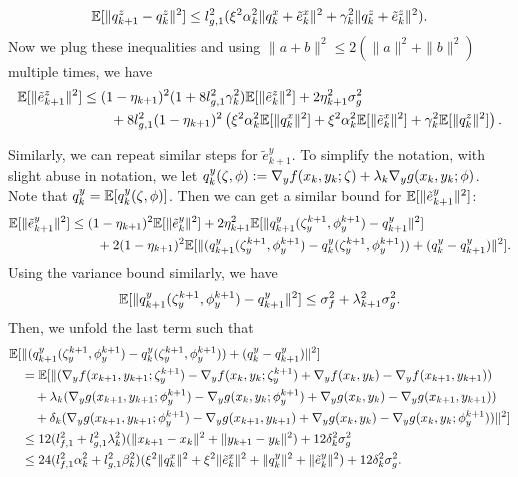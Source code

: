 \begin{align*}
    \mathbb{E}[\|q_{k+1}^z - q_k^z \|^2] \le l_{g,1}^2 (\xi^2 \alpha_k^2 \|q_k^x + \tilde{e}_k^x\|^2 + \gamma_k^2 \|q_k^z + \tilde{e}_k^z\|^2). 
\end{align*}
Now we plug these inequalities and using $\|a+b\|^2 \le 2(\|a\|^2 + \|b\|^2)$ multiple times, we have
\begin{align*}
    \mathbb{E}[\|\tilde{e}_{k+1}^z\|^2] &\le (1 - \eta_{k+1})^2 (1 + 8 l_{g,1}^2 \gamma_k^2) \mathbb{E}[\|\tilde{e}_k^z\|^2] + 2 \eta_{k+1}^2 \sigma_g^2 \\
    &\qquad + 8l_{g,1}^2 (1-\eta_{k+1})^2 \left( \xi^2\alpha_k^2 \mathbb{E}[\|q_k^x\|^2] + \xi^2\alpha_k^2 \mathbb{E}[\|\tilde{e}_k^x\|^2] + \gamma_k^2 \mathbb{E}[\|q_k^z\|^2] \right).
\end{align*}


Similarly, we can repeat similar steps for $\tilde{e}_{k+1}^y$. To simplify the notation, with slight abuse in notation, we let $q_k^y(\zeta, \phi) := \nabla_y f(x_{k}, y_{k};\zeta) + \lambda_{k} \nabla_y g (x_k, y_k; \phi)$. Note that $q_k^y = \mathbb{E}[q_k^y(\zeta, \phi)]$. Then we can get a similar bound for $\mathbb{E}[\| \tilde{e}_{k+1}^y \|^2]$:
\begin{align*}
    \mathbb{E}[\| \tilde{e}_{k+1}^y\|^2 ] &\le (1-\eta_{k+1})^2 \mathbb{E}[\| \tilde{e}_{k}^y\|^2 ] + 2 \eta_{k+1}^2 \mathbb{E}[\| q_{k+1}^y(\zeta_{y}^{k+1}, \phi_{y}^{k+1}) - q_{k+1}^y \|^2] \\
    &\qquad + 2(1-\eta_{k+1})^2 \mathbb{E}[\| (q_{k+1}^y (\zeta_{y}^{k+1}, \phi_{y}^{k+1}) - q_k^y (\zeta_{y}^{k+1}, \phi_{y}^{k+1})) + (q_k^y - q_{k+1}^y)\|^2 ].
\end{align*}
Using the variance bound similarly, we have
\begin{align*}
    \mathbb{E}[\| q_{k+1}^y(\zeta_{y}^{k+1}, \phi_{y}^{k+1}) - q_{k+1}^y \|^2] \le \sigma_f^2 + \lambda_{k+1}^2 \sigma_g^2.
\end{align*}
Then, we unfold the last term such that
\begin{align*}
    \mathbb{E}[&\| (q_{k+1}^y (\zeta_{y}^{k+1}, \phi_{y}^{k+1}) - q_k^y (\zeta_{y}^{k+1}, \phi_{y}^{k+1})) + (q_k^y - q_{k+1}^y)\|^2 ] \\
    &= \mathbb{E}[\| (\nabla_y f(x_{k+1}, y_{k+1}; \zeta_y^{k+1}) - \nabla_y f(x_{k}, y_{k}; \zeta_y^{k+1}) + \nabla_y f(x_{k}, y_k) - \nabla_y f(x_{k+1}, y_{k+1})) \\
    &\quad + \lambda_k (\nabla_y g(x_{k+1}, y_{k+1}; \phi_y^{k+1}) - \nabla_y g(x_k, y_k; \phi_y^{k+1}) + \nabla_y g(x_k, y_k) - \nabla_y g(x_{k+1}, y_{k+1})) \\
    &\quad + \delta_k (\nabla_y g(x_{k+1},y_{k+1}; \phi_{y}^{k+1}) - \nabla_y g(x_{k+1}, y_{k+1}) + \nabla_y g(x_k,y_k) - \nabla_y g(x_k, y_k; \phi_{y}^{k+1}) ) \|^2] \\
    &\le 12 (l_{f,1}^2  + l_{g,1}^2 \lambda_k^2) (\|x_{k+1} - x_k\|^2 + \|y_{k+1} - y_k\|^2) + 12 \delta_k^2 \sigma_g^2 \\
    &\le 24 (l_{f,1}^2 \alpha_k^2 + l_{g,1}^2 \beta_k^2) (\xi^2 \|q_k^x\|^2 + \xi^2 \|\tilde{e}_k^x\|^2 + \|q_k^y\|^2 + \|\tilde{e}_k^y\|^2) + 12 \delta_k^2 \sigma_g^2.
\end{align*}
